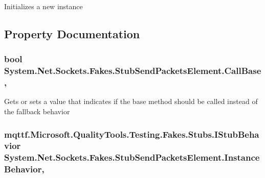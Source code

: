Initializes a new instance



\subsection{Property Documentation}
\hypertarget{class_system_1_1_net_1_1_sockets_1_1_fakes_1_1_stub_send_packets_element_ac6aaa9cf586abd8823395b7942d3b24a}{
\subsubsection[{Call\-Base}]{\setlength{\rightskip}{0pt plus 5cm}bool System.\-Net.\-Sockets.\-Fakes.\-Stub\-Send\-Packets\-Element.\-Call\-Base\hspace{0.3cm}{\ttfamily [get]}, {\ttfamily [set]}}}\label{class_system_1_1_net_1_1_sockets_1_1_fakes_1_1_stub_send_packets_element_ac6aaa9cf586abd8823395b7942d3b24a}


Gets or sets a value that indicates if the base method should be called instead of the fallback behavior

\hypertarget{class_system_1_1_net_1_1_sockets_1_1_fakes_1_1_stub_send_packets_element_a115c585c67d95b1192bcd3c226bd8923}{
\subsubsection[{Instance\-Behavior}]{\setlength{\rightskip}{0pt plus 5cm}mqttf.\-Microsoft.\-Quality\-Tools.\-Testing.\-Fakes.\-Stubs.\-I\-Stub\-Behavior System.\-Net.\-Sockets.\-Fakes.\-Stub\-Send\-Packets\-Element.\-Instance\-Behavior\hspace{0.3cm}{\ttfamily [get]}, {\ttfamily [set]}}}\label{class_system_1_1_net_1_1_sockets_1_1_fakes_1_1_stub_send_packets_element_a115c585c67d95b1192bcd3c226bd8923}


